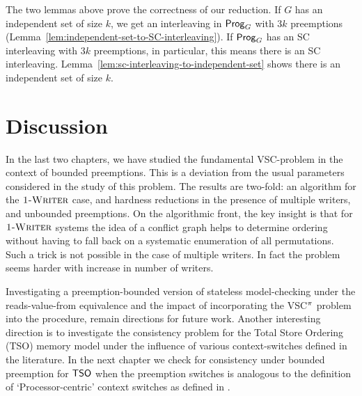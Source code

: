 The two lemmas above prove the correctness of our reduction. If $G$ has an independent set of size $k$, we get an interleaving in $\mathsf{Prog}_G$ with $3k$ preemptions (Lemma~\ref{lem:independent-set-to-SC-interleaving}). If $\mathsf{Prog}_G$ has an SC interleaving with $3k$ preemptions, in particular, this means there is an SC interleaving. Lemma~\ref{lem:sc-interleaving-to-independent-set} shows there is an independent set of size $k$. 

\section{Discussion}

In the last two chapters, we have studied  the fundamental VSC-problem in the context of bounded preemptions. This is a deviation from the usual parameters considered in the study of this problem. The results are two-fold: an algorithm for the $\textsc{1-Writer}$ case, and hardness reductions in the presence of multiple
writers, and unbounded preemptions. On the algorithmic front, the key insight is
that for $\textsc{1-Writer}$ systems the idea of a conflict graph helps to determine ordering without having to fall back on a systematic enumeration of all permutations. Such a trick is not possible in the case of multiple writers. In fact the problem seems harder with increase in number of writers. 


Investigating a preemption-bounded version of stateless model-checking under
the reads-value-from equivalence and the impact of incorporating the VSC$^\pi$ problem into the procedure, remain directions for future work. Another interesting
direction is to investigate the consistency problem for the Total Store Ordering
(TSO) memory model under the influence of various context-switches \cite{TSO-context-bounding} defined
in the literature. In the next chapter we check for consistency under bounded preemption for $\mathsf{TSO}$ when the preemption switches is analogous to the definition of `Processor-centric' context switches as defined in \cite{TSO-context-bounding}.

\endinput










 




